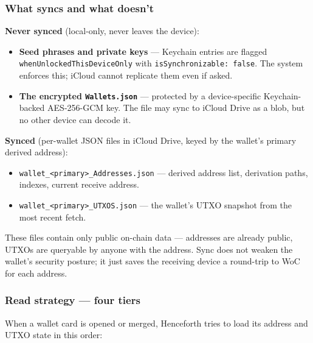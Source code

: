 \documentclass[a4paper, 11pt, openany]{book}
\begin{document}
\subsubsection*{What syncs and what doesn't}

\textbf{Never synced} (local-only, never leaves the device):

\begin{itemize}
\item \textbf{Seed phrases and private keys} --- Keychain entries are flagged \texttt{whenUnlockedThisDeviceOnly} with \texttt{isSynchronizable: false}. The system enforces this; iCloud cannot replicate them even if asked.
\item \textbf{The encrypted \texttt{Wallets.json}} --- protected by a device-specific Keychain-backed AES-256-GCM key. The file may sync to iCloud Drive as a blob, but no other device can decode it.
\end{itemize}

\textbf{Synced} (per-wallet JSON files in iCloud Drive, keyed by the wallet's primary derived address):

\begin{itemize}
\item \texttt{wallet\_<primary>\_Addresses.json} --- derived address list, derivation paths, indexes, current receive address.
\item \texttt{wallet\_<primary>\_UTXOS.json} --- the wallet's UTXO snapshot from the most recent fetch.
\end{itemize}

These files contain only public on-chain data --- addresses are already public, UTXOs are queryable by anyone with the address. Sync does not weaken the wallet's security posture; it just saves the receiving device a round-trip to WoC for each address.

\subsubsection*{Read strategy --- four tiers}

When a wallet card is opened or merged, Henceforth tries to load its address and UTXO state in this order:
\end{document}
